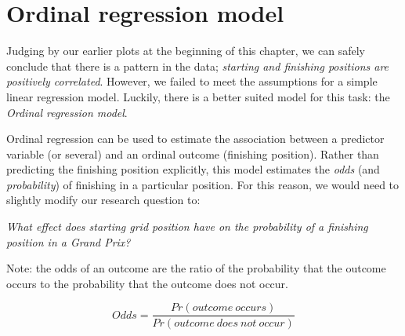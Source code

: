 \documentclass[
]{book}
\begin{document}
\hypertarget{ordinal-regression-model}{%
\section{Ordinal regression model}\label{ordinal-regression-model}}

Judging by our earlier plots at the beginning of this chapter, we can safely conclude that there is a pattern in the data; \emph{starting and finishing positions are positively correlated}. However, we failed to meet the assumptions for a simple linear regression model. Luckily, there is a better suited model for this task: the \emph{Ordinal regression model}.

Ordinal regression can be used to estimate the association between a predictor variable (or several) and an ordinal outcome (finishing position). Rather than predicting the finishing position explicitly, this model estimates the \emph{odds} (and \emph{probability}) of finishing in a particular position. For this reason, we would need to slightly modify our research question to:

\emph{What effect does starting grid position have on the probability of a finishing position in a Grand Prix?}

Note: the odds of an outcome are the ratio of the probability that the outcome occurs to the probability that the outcome does not occur.

\[ Odds = \frac{Pr(outcome \ occurs)}{Pr(outcome \ does \ not \ occur)} \]
\end{document}
